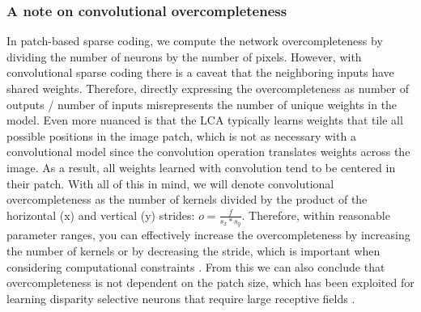 \subsubsection{A note on convolutional overcompleteness}
In patch-based sparse coding, we compute the network overcompleteness by dividing the number of neurons by the number of pixels. However, with convolutional sparse coding there is a caveat that the neighboring inputs have shared weights. Therefore, directly expressing the overcompleteness as number of outputs / number of inputs misrepresents the number of unique weights in the model. Even more nuanced is that the LCA typically learns weights that tile all possible positions in the image patch, which is not as necessary with a convolutional model since the convolution operation translates weights across the image. As a result, all weights learned with convolution tend to be centered in their patch. With all of this in mind, we will denote convolutional overcompleteness as the number of kernels divided by the product of the horizontal (x) and vertical (y) strides: $o = \tfrac{f}{s_{x}*s_{y}}$. Therefore, within reasonable parameter ranges, you can effectively increase the overcompleteness by increasing the number of kernels or by decreasing the stride, which is important when considering computational constraints \parencite{schultz2014replicating}. From this we can also conclude that overcompleteness is not dependent on the patch size, which has been exploited for learning disparity selective neurons that require large receptive fields \parencite{lundquist2016sparse}.


